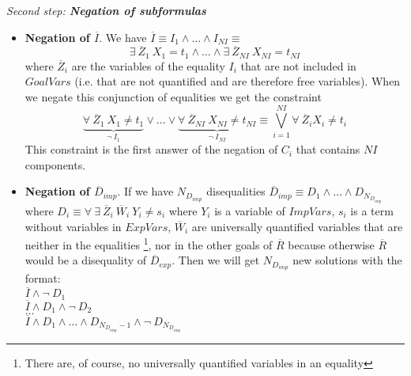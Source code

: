 \documentclass{llncs}
\begin{document}
\noindent
{\em Second step: {\bf Negation of subformulas}}

        \begin{itemize}

           \item {\bf Negation of $\overline{I}$}. We have $\overline{I}
           \equiv I_1 \wedge \ldots \wedge I_{NI} \equiv$ \[ \exists~
           \overline{Z}_1~ X_1 = t_1 \wedge \ldots \wedge \exists~
           \overline{Z}_{NI}~ X_{NI} = t_{NI} \] where
           $\overline{Z}_i$ are the variables of the equality $I_i$ that
           are not included in $GoalVars$ (i.e. that are not quantified
           and are therefore free variables). When we negate this
           conjunction of equalities we get the constraint 
                \[
           \underbrace{\forall~ \overline{Z}_1~ X_1 \neq t_1} _{\neg~
           I_1} \vee \ldots \vee \underbrace{\forall~
           \overline{Z}_{NI}~ X_{NI} \neq t_{NI} } _{\neg~ I_{NI}}
           \equiv %
           \bigvee_{i=1}^{NI} \forall~ \overline{Z}_i X_i
           \neq t_i \] 
           This constraint is the first answer of the
           negation of $C_i$ that contains $NI$ components.

           \item {\bf Negation of $\overline{D}_{imp}$}. If we have
           $N_{D_{imp}}$ disequalities $\overline{D}_{imp} \equiv D_1
           \wedge \ldots \wedge D_{N_{D_{imp}}}$ where $ D_i \equiv
           \forall~ \exists~ \overline{Z}_i ~\overline{W}_i ~  Y_i
           \neq s_i$ where $Y_i$ is a variable of $ImpVars$, $s_i$ is
           a term without variables in $ExpVars$, $\overline{W}_i$ are
           universally quantified variables that are neither in the
           equalities \footnote{There are, of course, no universally
           quantified variables in an equality}, nor in the other
           goals of $\overline{R}$ because otherwise $\overline{R}$
           would be a disequality of $\overline{D}_{exp}$. Then we
           will get $N_{D_{imp}}$ new solutions with the format: \\

           $\overline{I} \wedge \neg~ D_1 $ \\ 
           $\overline{I} \wedge
           D_1 \wedge \neg~ D_2 $ \\ 
           $\ldots $ \\ 
           $\overline{I} \wedge
           D_1 \wedge \ldots \wedge D_{N_{D_{imp}}-1} \wedge \neg~
           D_{N_{D_{imp}}}$ \\ 


\end{itemize}
\end{document}
